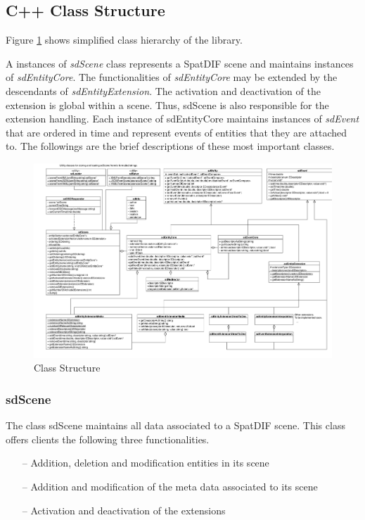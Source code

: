 \documentclass[a4paper]{article}
\begin{document}
\subsection{C++ Class Structure}

Figure \ref{fig:class_structure} shows simplified class hierarchy of the library. 

A instances of {\it sdScene} class represents a SpatDIF scene and maintains instances of {\it sdEntityCore}. The functionalities of {\it sdEntityCore} may be extended by the descendants of {\it sdEntityExtension}. 
The activation and deactivation of the extension is global within a scene. 
Thus, sdScene is also responsible for the extension handling. 
Each instance of sdEntityCore maintains instances of {\it sdEvent} that are ordered in time and represent events of entities that they are attached to. 
The followings are the brief descriptions of these most important classes.

\begin{figure}[t]
\centerline{
	\includegraphics[width= 17.5cm]{classes.pdf}}
\caption{Class Structure}
\label{fig:class_structure}
\end{figure}

\subsubsection{sdScene}
The class sdScene maintains all data associated to a SpatDIF scene. This class offers clients the following three functionalities.

\begin{itemize}[leftmargin=*]
\item[--] Addition, deletion and modification entities in its scene
\item[--] Addition and modification of the meta data associated to its scene
\item[--] Activation and deactivation of the extensions
\end{itemize}
\end{document}
